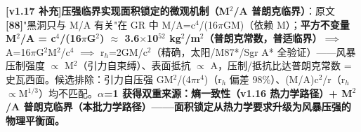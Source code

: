 \documentclass[12pt]{article}
\newcommand{\mtag}[1]{\textbf{[#1]}}
\newcommand{\up}[1]{\ensuremath{^{#1}}}
\newcommand{\down}[1]{\ensuremath{_{#1}}}
\begin{document}
\textbf{\mtag{v1.17 补充}压强临界实现面积锁定的微观机制（M\up{2}/A 普朗克临界）}：原文\mtag{88}"黑洞只与 M/A 有关"在 GR 中 M/A=c\up{4}/(16\ensuremath{\pi}GM)（依赖 M）；\textbf{平方不变量 M\up{2}/A = c\up{4}/(16\ensuremath{\pi}G\up{2}) \ensuremath{\approx} 3.6\ensuremath{\times}10\up{52} kg\up{2}/m\up{2}（普朗克常数，普适临界）}\ensuremath{\implies} A=16\ensuremath{\pi}G\up{2}M\up{2}/c\up{4} \ensuremath{\implies} r\down{h}=2GM/c\up{2}（精确，太阳/M87*/Sgr A* 全验证）------风暴压制强度 \ensuremath{\propto} M\up{2}（引力自束缚）、表面抵抗 \ensuremath{\propto} A，压制/抵抗比达普朗克常数 = 史瓦西面。候选排除：引力自压强 GM\up{2}/(4\ensuremath{\pi}r\up{4})（r\down{h} 偏差 98\%）、(M/A)c\up{2}/r（r\down{h}\ensuremath{\propto}M\up{1/3}）均不匹配。\textbf{\ensuremath{\alpha}=1 获得双重来源：熵一致性（v1.16 热力学路径）+ M\up{2}/A 普朗克临界（本批力学路径）------面积锁定从热力学要求升级为风暴压强的物理平衡面。}
\end{document}
